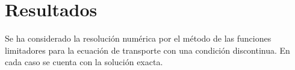 













\chapter{Resultados}

Se ha considerado la resolución numérica por el método de las
funciones limitadores para la ecuación de transporte con una
condición discontinua.
En cada caso se cuenta con la solución exacta.

